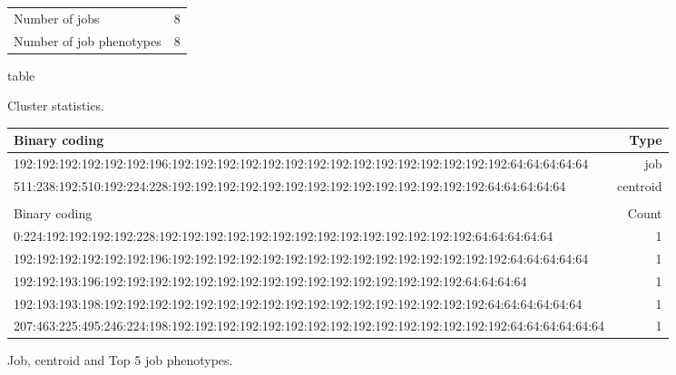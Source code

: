 \documentclass{jhps}
\begin{document}
\noindent\begin{minipage}{\textwidth}
\captionsetup{type=table}

\begingroup
  \begin{subtable}{\textwidth}
  \centering
  \begin{tabular}{ll}
    Number of jobs & 8 \\
    Number of job phenotypes & 8 \\
  \end{tabular}
  \caption{table}{Cluster statistics.}
  \label{tab:use_case:bin_aggzeros:stats}
\end{subtable}
\endgroup

\medskip

\begingroup
  \begin{subtable}{\textwidth}
  \centering
  \begin{tiny}
    \begin{tabular}{l|r}
      \rowcolor{tblhead}
      Binary coding                                                                                             &  Type     \\
      \hline
      192:192:192:192:192:192:196:192:192:192:192:192:192:192:192:192:192:192:192:192:192:192:64:64:64:64:64    &  job      \\
      511:238:192:510:192:224:228:192:192:192:192:192:192:192:192:192:192:192:192:192:192:64:64:64:64:64        &  centroid \\
      \multicolumn{2}{l}{}                                                                                      \\
      \rowcolor{tblhead}
      Binary coding                                                                                             &  Count    \\
      \hline
      0:224:192:192:192:192:228:192:192:192:192:192:192:192:192:192:192:192:192:192:192:64:64:64:64:64          &  1        \\
      192:192:192:192:192:192:196:192:192:192:192:192:192:192:192:192:192:192:192:192:192:192:64:64:64:64:64    &  1        \\
      192:192:193:196:192:192:192:192:192:192:192:192:192:192:192:192:192:192:192:192:64:64:64:64               &  1        \\
      192:193:193:198:192:192:192:192:192:192:192:192:192:192:192:192:192:192:192:192:192:64:64:64:64:64:64     &  1        \\
      207:463:225:495:246:224:198:192:192:192:192:192:192:192:192:192:192:192:192:192:192:192:64:64:64:64:64:64 &  1        \\
    \end{tabular}
  \end{tiny}
  \caption{Job, centroid and Top 5 job phenotypes.}
  \label{tab:use_case:bin_aggzeros:top_jobs}
\end{subtable}
\endgroup


\end{minipage}
\end{document}
